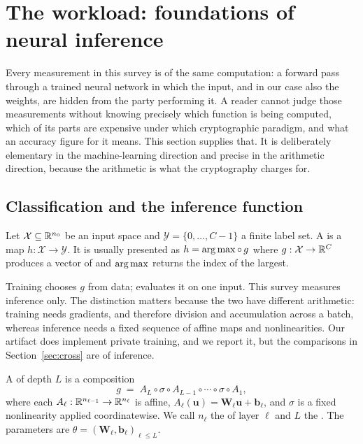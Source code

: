 \section{The workload: foundations of neural inference}
\label{sec:ml}

Every measurement in this survey is of the same computation: a forward pass
through a trained neural network in which the input, and in our case also the
weights, are hidden from the party performing it. A reader cannot judge those
measurements without knowing precisely which function is being computed, which of
its parts are expensive under which cryptographic paradigm, and what an accuracy
figure for it means. This section supplies that. It is deliberately elementary in
the machine-learning direction and precise in the arithmetic direction, because
the arithmetic is what the cryptography charges for.

\subsection{Classification and the inference function}
\label{sec:ml:class}

\begin{definition}
\label{def:classifier}
Let $\mathcal{X} \subseteq \mathbb{R}^{n_0}$ be an input space and
$\mathcal{Y} = \{0,\dots,C-1\}$ a finite label set. A  is a map
$h : \mathcal{X} \to \mathcal{Y}$. It is usually presented as
$h = \operatorname*{arg\,max} \circ\, g$ where $g : \mathcal{X} \to \mathbb{R}^{C}$ produces a vector of
 and $\operatorname*{arg\,max}$ returns the index of the largest.
\end{definition}

Training chooses $g$ from data;  evaluates it on one input. This
survey measures inference only. The distinction matters because the two have
different arithmetic: training needs gradients, and therefore division and
accumulation across a batch, whereas inference needs a fixed sequence of affine
maps and nonlinearities. Our artifact does implement private training, and we
report it, but the comparisons in Section~\ref{sec:cross} are of inference.

\begin{definition}
\label{def:ffn}
A  of depth $L$ is a composition
\[
  g \;=\; A_L \circ \sigma \circ A_{L-1} \circ \cdots \circ \sigma \circ A_1 ,
\]
where each $A_\ell : \mathbb{R}^{n_{\ell-1}} \to \mathbb{R}^{n_\ell}$ is affine,
$A_\ell(\mathbf{u}) = \mathbf{W}_\ell \mathbf{u} + \mathbf{b}_\ell$, and $\sigma$
is a fixed nonlinearity applied coordinatewise. We call $n_\ell$ the 
of layer $\ell$ and $L$ the . The parameters are
$\theta = (\mathbf{W}_\ell, \mathbf{b}_\ell)_{\ell \le L}$.
\end{definition}

